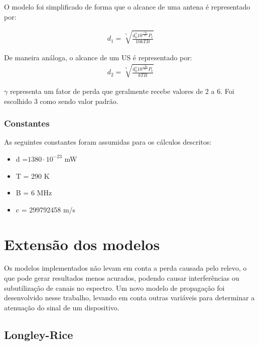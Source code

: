 O modelo foi simplificado de forma que o alcance de uma antena é representado por:

\begin{align}
  \label{dLogDistAnt} d_1 = \sqrt[\gamma]{\frac{d_0^{\gamma}10^{\frac{-L_0}{10}}  P_t}{10kTB}}
\end{align}

De maneira análoga, o alcance de um US é representado por:
\begin{align}
  \label{dLogDistDev} d_2 = \sqrt[\gamma]{\frac{d_0^{\gamma}10^{\frac{-L_0}{10}}  P_t}{kTB}}
\end{align}

\begin{math}\gamma \end{math} representa um fator de perda que geralmente recebe valores de 2 a 6. Foi escolhido 3 como sendo valor padrão.

\subsubsection{Constantes}

As seguintes constantes foram assumidas para os cálculos descritos:

\begin{itemize}
\item d =\begin{math}1380\cdot 10^{-23}\end{math}  mW
\item T = 290 K
\item B = 6 MHz
\item c = 299792458 m/s
\end{itemize}

\section{Extensão dos modelos}

Os modelos implementados não levam em conta a perda causada pelo relevo, o que pode gerar resultados menos acurados, podendo causar interferências ou subutilização de canais no espectro. Um novo modelo de propagação foi desenvolvido nesse trabalho, levando em conta outras variáveis para determinar a atenuação do sinal de um dispositivo.

\subsection{Longley-Rice}
\label{subsec:longleyricesection}

